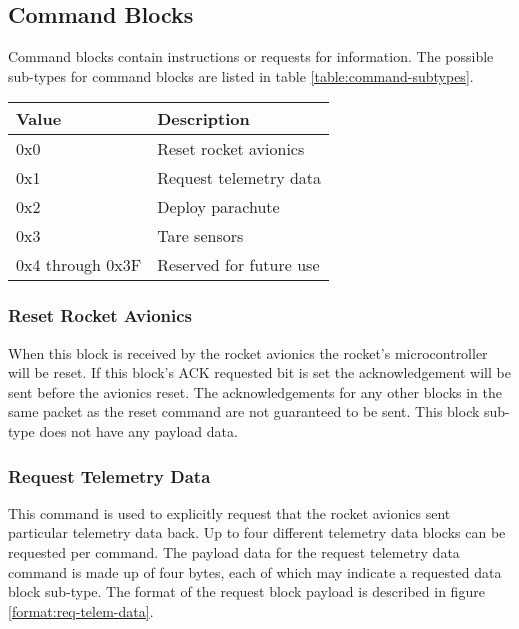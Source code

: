 \subsection{Command Blocks}

Command blocks contain instructions or requests for information. The possible sub-types for command blocks are listed
in table \ref{table:command-subtypes}.

\begin{table*}[htb]
    \centering
    \begin{tabular}{@{}ll@{}}
        \toprule
        Value            & Description             \\
        \midrule
        0x0              & Reset rocket avionics   \\
        0x1              & Request telemetry data  \\
        0x2              & Deploy parachute        \\
        0x3              & Tare sensors            \\
        0x4 through 0x3F & Reserved for future use \\
        \bottomrule
    \end{tabular}
    \caption{Command Block Sub-types}
    \label{table:command-subtypes}
\end{table*}

\subsubsection{Reset Rocket Avionics}
When this block is received by the rocket avionics the rocket’s microcontroller will be reset. If this block’s ACK
requested bit is set the acknowledgement will be sent before the avionics reset. The acknowledgements for any other
blocks in the same packet as the reset command are not guaranteed to be sent. This block sub-type does not have any
payload data.

\subsubsection{Request Telemetry Data}
This command is used to explicitly request that the rocket avionics sent particular telemetry data back. Up to four
different telemetry data blocks can be requested per command. The payload data for the request telemetry data command
is made up of four bytes, each of which may indicate a requested data block sub-type. The format of the request block
payload is described in figure \ref{format:req-telem-data}.

